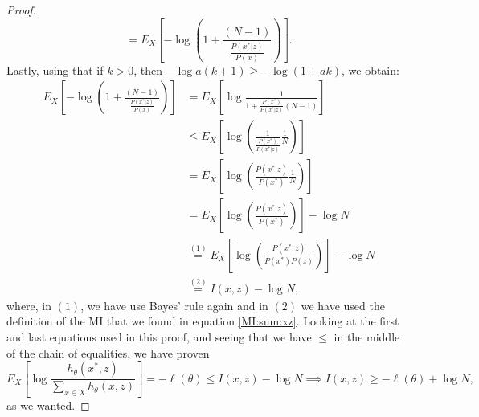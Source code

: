 \begin{proof}
\[= E_X\left[ -\log\left( 1+ \frac{ (N-1)}{\frac{P(x^*|z)}{P(x)}} \right)\right].
\] 
Lastly, using that if $k > 0$, then $- \log a(k+1) \geq -\log(1+ak)$, we obtain:
\begin{align*}
E_X\left[ -\log\left( 1+ \frac{ (N-1)}{\frac{P(x^*|z)} {P(x)}} \right)\right] &  =
E_X\left[ \log \frac{1}{ 1+ \frac{P(x^*)}{P(x^*|z)}(N-1)}\right] \\
& \leq E_X\left[ \log\left(\frac{1}{\frac{P(x^*)}{P(x^*|z)}}\frac{1}{N}\right)\right]\\
& = E_X\left[ \log\left(\frac{P(x^*|z)}{P(x^*)} \frac{1}{N}\right)\right]\\
& = E_X \left[ \log\left(\frac{P(x^*|z)}{P(x^*)}\right)\right] - \log N \\
& \stackrel{(1)}{=} E_X \left[ \log\left(\frac{P(x^*,z)}{P(x^*)P(z)}\right)\right] - \log N\\
& \stackrel{(2)}{=} I(x,z) - \log N,
\end{align*}
where, in $(1)$, we have use Bayes' rule again and in $(2)$ we have used the definition of the MI that we found in equation \ref{MI:sum:xz}. Looking at the first and last equations used in this proof, and seeing that we have $\leq$ in the middle of the chain of equalities, we have proven
\[
    E_X \left[ \log \frac{h_\theta(x^*,z)}{\sum_{x \in X}h_\theta(x,z)}\right] = - \ell (\theta) \leq I(x,z) - \log N \implies I(x,z) \geq -\ell(\theta)+ \log N,
\]
as we wanted.   
\end{proof}

